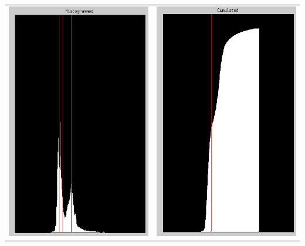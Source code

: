 \documentclass[12pt]{article}
\begin{document}
\begin{table}[h!]
\begin{center}
\begin{tabular} {c c}
  \includegraphics[scale=.8]{Images/TotalModule/Histogrammed.png}
&
  \includegraphics[scale=.8]{Images/TotalModule/Cumulated.png}

\end{tabular}
\end{center}
\end{table}
\end{document}
